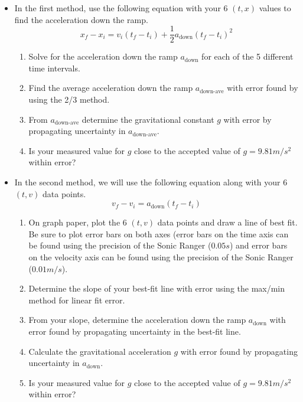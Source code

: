 \begin{itemize}
\item{In the first method, use the following equation with your 6 $(t,x)$ values to find the acceleration down the ramp.
\begin{equation}
    x_f - x_i =   v_{i}(t_f - t_i) + \frac{1}{2}a_\text{down}(t_f  - t_i )^2
\end{equation}
\begin{enumerate}
\item Solve for the acceleration down the ramp $a_\text{down}$ for each of the 5 different time intervals.
\item  Find the average acceleration down the ramp $a_{\text{down-ave}}$ with error found by using the 2/3 method.
\item From $a_\text{down-ave}$ determine the gravitational constant $g$ with error by propagating uncertainty in $a_{\text{down-ave}}$.
\item Is your measured value for $g$ close to the accepted value of $g=9.81 m/s^2$ within error?
\end{enumerate}
}
\item{In the second method, we will use the following equation along with your 6 $(t,v)$ data points.
\begin{equation}
    v_f - v_{i} = a_\text{down} (t_f - t_i)
\end{equation}
\begin{enumerate}
\item On graph paper, plot the 6 $(t,v)$ data points and draw a line of best fit. Be sure to plot error bars on both axes (error bars on the time axis can be found using the precision of the Sonic Ranger ($0.05 s$) and error bars on the velocity axis can be found using the precision of the Sonic Ranger ($0.01 m/s$).
\item Determine the slope of your best-fit line with error using the max/min method for linear fit error.
\item From your slope, determine the acceleration down the ramp $a_{\text{down}}$ with error found by propagating uncertainty in the best-fit line.
\item Calculate the gravitational acceleration $g$ with error found by propagating uncertainty in $a_\text{down}$.
\item Is your measured value for $g$ close to the accepted value of $g=9.81 m/s^2$ within error?
\end{enumerate}
}
\end{itemize}


